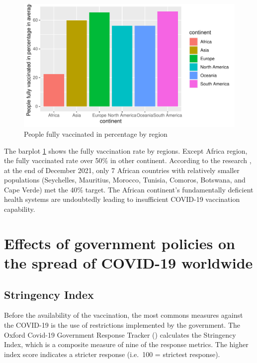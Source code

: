 \documentclass[11pt,a4paper,]{article}
\begin{document}
\clearpage

\begin{figure}

{\centering \includegraphics{report_files/figure-latex/Figure3-1} 

}

\caption{People fully vaccinated in percentage by region}\label{fig:Figure3}
\end{figure}

The barplot \ref{fig:Figure3} shows the fully vaccination rate by regions. Except Africa region, the fully vaccinated rate over 50\% in other continent. According to the research \textcite{African-COVID-19-vaccination}, at the end of December 2021, only 7 African countries with relatively smaller populations (Seychelles, Mauritius, Morocco, Tunisia, Comoros, Botswana, and Cape Verde) met the 40\% target. The African continent's fundamentally deficient health systems are undoubtedly leading to insufficient COVID-19 vaccination capability.

\clearpage

\section*{Effects of government policies on the spread of COVID-19 worldwide}

\subsection*{Stringency Index}

Before the availability of the vaccination, the most commons measures against the COVID-19 is the use of restrictions implemented by the government. The Oxford Covid-19 Government Response Tracker (\textcite{OxCGRT}) calculates the Stringency Index, which is a composite measure of nine of the response metrics. The higher index score indicates a stricter response (i.e.~100 = strictest response).
\end{document}
